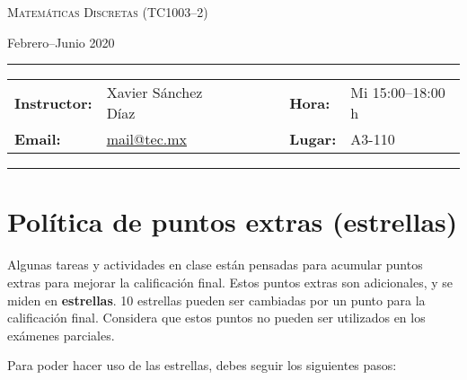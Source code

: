 \documentclass[12pt, letterpaper, oneside]{article}
\makeatletter
\newcommand{\thecourse}{Matemáticas Discretas (TC1003--2)}
\newcommand{\thesemester}{Febrero--Junio 2020}
\newcommand{\theinstructor}{Xavier Sánchez Díaz}
\newcommand{\themail}{mail@tec.mx}
\newcommand{\thetime}{Mi 15:00--18:00 h}
\newcommand{\theplace}{A3-110}
\makeatother
\begin{document}
  \begin{center}
  {\Large \textsc{\thecourse}}
  \end{center}
  \begin{center}
  \thesemester
  \end{center}

  \begin{center}
  \rule{6in}{0.4pt}
  \begin{minipage}[t]{.75\textwidth}
  \begin{tabular}{llcccll}
  \textbf{Instructor:} & \theinstructor & & &  & \textbf{Hora:} & \thetime \\
  \textbf{Email:} &  \href{mailto:mail@tec.mx}{\themail} & & & & \textbf{Lugar:} & \theplace
  \end{tabular}
  \end{minipage}
  \rule{6in}{0.4pt}
  \end{center}
  \vspace{.5cm}
  \setlength{\unitlength}{1in}
  \renewcommand{\arraystretch}{2}

  \section{Política de puntos extras (estrellas)}

  Algunas tareas y actividades en clase están pensadas para acumular puntos extras para mejorar la calificación final.
  Estos puntos extras son adicionales, y se miden en \textbf{estrellas}.
  10 estrellas pueden ser cambiadas por un punto para la calificación final.
  Considera que estos puntos no pueden ser utilizados en los exámenes parciales.

  Para poder hacer uso de las estrellas, debes seguir los siguientes pasos:
\end{document}
